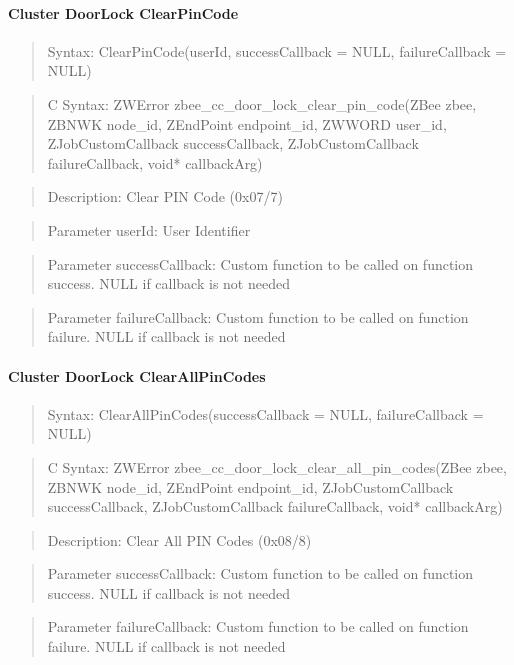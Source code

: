 \paragraph{Cluster DoorLock ClearPinCode}
\begin{quote}Syntax: ClearPinCode(userId, successCallback = NULL, failureCallback = NULL)\end{quote}
\begin{quote}C Syntax: ZWError zbee\_cc\_door\_lock\_clear\_pin\_code(ZBee zbee, ZBNWK node\_id, ZEndPoint endpoint\_id, ZWWORD user\_id, ZJobCustomCallback successCallback, ZJobCustomCallback failureCallback, void* callbackArg)\end{quote}
\begin{quote}Description: Clear PIN Code (0x07/7)\end{quote}
\begin{quote}Parameter userId: User Identifier\end{quote}
\begin{quote}Parameter successCallback: Custom function to be called on function success. NULL if callback is not needed\end{quote}
\begin{quote}Parameter failureCallback: Custom function to be called on function failure. NULL if callback is not needed\end{quote}


\paragraph{Cluster DoorLock ClearAllPinCodes}
\begin{quote}Syntax: ClearAllPinCodes(successCallback = NULL, failureCallback = NULL)\end{quote}
\begin{quote}C Syntax: ZWError zbee\_cc\_door\_lock\_clear\_all\_pin\_codes(ZBee zbee, ZBNWK node\_id, ZEndPoint endpoint\_id, ZJobCustomCallback successCallback, ZJobCustomCallback failureCallback, void* callbackArg)\end{quote}
\begin{quote}Description: Clear All PIN Codes (0x08/8)\end{quote}
\begin{quote}Parameter successCallback: Custom function to be called on function success. NULL if callback is not needed\end{quote}
\begin{quote}Parameter failureCallback: Custom function to be called on function failure. NULL if callback is not needed\end{quote}


